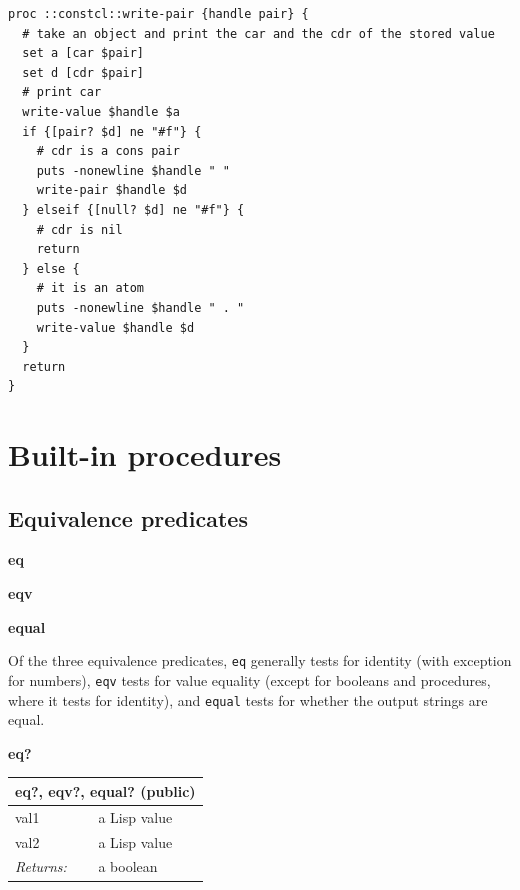 \documentclass[twoside,9pt]{report}
\begin{document}
\noindent\makebox[\linewidth]{\rule{\linewidth}{0.4pt}}
\begin{lstlisting}
proc ::constcl::write-pair {handle pair} {
  # take an object and print the car and the cdr of the stored value
  set a [car $pair]
  set d [cdr $pair]
  # print car
  write-value $handle $a
  if {[pair? $d] ne "#f"} {
    # cdr is a cons pair
    puts -nonewline $handle " "
    write-pair $handle $d
  } elseif {[null? $d] ne "#f"} {
    # cdr is nil
    return
  } else {
    # it is an atom
    puts -nonewline $handle " . "
    write-value $handle $d
  }
  return
}
\end{lstlisting}
\noindent\makebox[\linewidth]{\rule{\linewidth}{0.4pt}}
\chapter{Built-in procedures}
\label{built-in-procedures}
\section{Equivalence predicates}
\label{equivalence-predicates}

\textbf{eq}


\textbf{eqv}


\textbf{equal}


Of the three equivalence predicates, \texttt{eq} generally tests for identity (with exception for numbers), \texttt{eqv} tests for value equality (except for booleans and procedures, where it tests for identity), and \texttt{equal} tests for whether the output strings are equal.


\textbf{eq?}

\begin{tabular}{ |l l| }
\hline
\multicolumn{2}{|l|}{eq?, eqv?, equal? (public)} \\
\hline
val1 & a Lisp value \\
val2 & a Lisp value \\
\textit{Returns:} & a boolean \\
\hline
\end{tabular}
\end{document}
